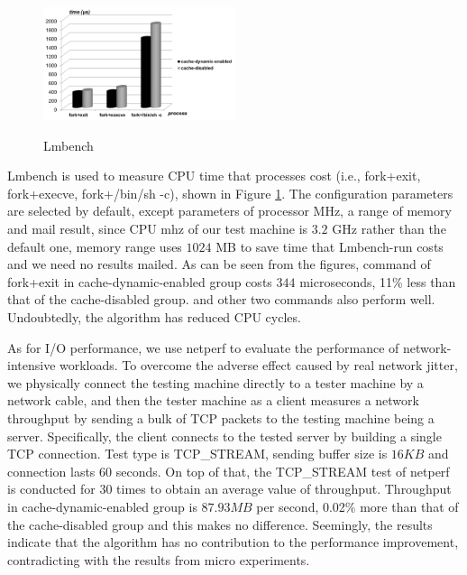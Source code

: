 \begin{figure}[ht]
\centering
\includegraphics[width=0.5\textwidth]{image/macro/lmbench.png} \\
\caption{Lmbench}
\label{fig:lmbench}
\end{figure}

Lmbench is used to measure CPU time that processes cost (i.e., fork+exit, fork+execve, fork+/bin/sh -c), shown in Figure \ref{fig:lmbench}. The configuration parameters are selected by default, except parameters of processor MHz, a range of memory and mail result, since CPU mhz of our test machine is $3.2$ GHz rather than the default one, memory range uses $1024$ MB to save time that Lmbench-run costs and we need no results mailed. As can be seen from the figures, command of fork+exit in cache-dynamic-enabled group costs $344$ microseconds, 11\% less than that of the cache-disabled group. and other two commands also perform well. Undoubtedly, the algorithm has reduced CPU cycles.

As for I/O performance, we use netperf to evaluate the performance of network-intensive workloads. To overcome the adverse effect caused by real network jitter, we physically connect the testing machine directly to a tester machine by a network cable, and then the tester machine as a client measures a network throughput by sending a bulk of TCP packets to the testing machine being a server. Specifically, the client connects to the tested server by building a single TCP connection. Test type is TCP\_STREAM, sending buffer size is $16KB$ and connection lasts $60$ seconds. On top of that, the TCP\_STREAM test of netperf is conducted for $30$ times to obtain an average value of throughput. Throughput in cache-dynamic-enabled group is $87.93 MB$ per second, 0.02\% more than that of the cache-disabled group and this makes no difference. 
Seemingly, the results indicate that the algorithm has no contribution to the performance improvement, contradicting with the results from micro experiments.

